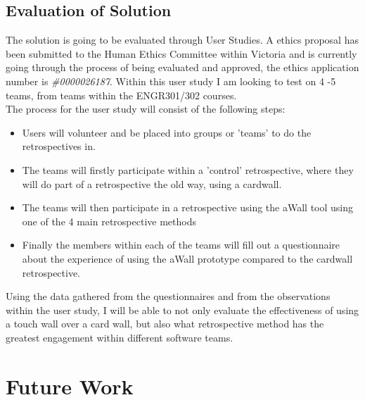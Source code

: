 \documentclass[11pt
              , a4paper
              , twoside
              , openright
              ]{report}
\begin{document}
\section{Evaluation of Solution}
The solution is going to be evaluated through User Studies. A ethics proposal has been submitted to the Human Ethics Committee within Victoria and is currently going through the process of being evaluated and approved, the ethics application number is \textit{\#0000026187}. Within this user study I am looking to test on 4 -5 teams, from teams within the ENGR301/302 courses. \\
The process for the user study will consist of the following steps:
\begin{itemize}
	\item Users will volunteer and be placed into groups or 'teams' to do the retrospectives in.
	\item The teams will firstly participate within a 'control' retrospective, where they will do part of a retrospective the old way, using a cardwall.
	\item The teams will then participate in a retrospective using the aWall tool using one of the 4 main retrospective methods
	\item Finally the members within each of the teams will fill out a questionnaire about the experience of using the aWall prototype compared to the cardwall retrospective.
\end{itemize}

Using the data gathered from the questionnaires and from the observations within the user study, I will be able to not only evaluate the effectiveness of using a touch wall over a card wall, but also what retrospective method has the greatest engagement within different software teams. 

\chapter{Future Work}\label{C:future}
\end{document}
